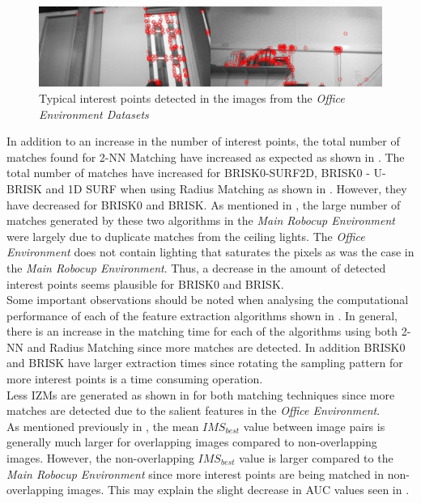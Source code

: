 \documentclass[11pt]{report}
\begin{document}
\begin{figure}
  \centering
    \includegraphics[width=1.0\textwidth]{../Drawings/Matching/dataset2_interestPoints.jpg}
    \caption{Typical interest points detected in the images from the \textit{Office Environment Datasets}} 
    \label{fig:oe_interestPoints}
\end{figure}


In addition to an increase in the number of interest points, the total number of matches found for 2-NN Matching have increased as expected as shown in . The total number of matches have increased for BRISK0-SURF2D, BRISK0 - U-BRISK and 1D SURF when using Radius Matching as shown in . However, they have decreased for BRISK0 and BRISK. As mentioned in , the large number of matches generated by these two algorithms in the \textit{Main Robocup Environment} were largely due to duplicate matches from the ceiling lights. The \textit{Office Environment} does not contain lighting that saturates the pixels as was the case in the \textit{Main Robocup Environment}. Thus, a decrease in the amount of detected interest points seems plausible for BRISK0 and BRISK.\\


Some important observations should be noted when analysing the computational performance of each of the feature extraction algorithms shown in . In general, there is an increase in the matching time for each of the algorithms using both 2-NN and Radius Matching since more matches are detected. In addition BRISK0 and BRISK have larger extraction times since rotating the sampling pattern for more interest points is a time consuming operation.\\

Less IZMs are generated as shown in  for both matching techniques since more matches are detected due to the salient features in the \textit{Office Environment}. \\

As mentioned previously in , the mean $IMS_{best}$ value between image pairs is generally much larger for overlapping images compared to non-overlapping images. However, the non-overlapping $IMS_{best}$ value is larger compared to the \textit{Main Robocup Environment} since more interest points are being matched in non-overlapping images. This may explain the slight decrease in AUC values seen in .\\
\end{document}
